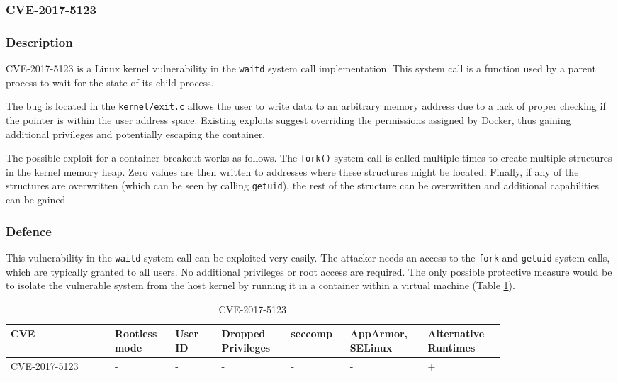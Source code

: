 \subsubsection{CVE-2017-5123}
\subsubsection*{Description}

CVE-2017-5123 is a Linux kernel vulnerability in the \texttt{waitd} system call implementation. This system call is a function used by a parent process to wait for the state of its child process.

The bug is located in the \texttt{kernel/exit.c} allows the user to write data to an arbitrary memory address due to a lack of proper checking if the pointer is within the user address space. Existing exploits suggest overriding the permissions assigned by Docker, thus gaining additional privileges and potentially escaping the container.

The possible exploit for a container breakout works as follows. The \texttt{fork()} system call is called multiple times to create multiple structures in the kernel memory heap. Zero values are then written to addresses where these structures might be located. Finally, if any of the structures are overwritten (which can be seen by calling \texttt{getuid}), the rest of the structure can be overwritten and additional capabilities can be gained.

\subsubsection*{Defence}

This vulnerability in the \texttt{waitd} system call can be exploited very easily. The attacker needs an access to the \texttt{fork} and \texttt{getuid} system calls, which are typically granted to all users. No additional privileges or root access are required. The only possible protective measure would be to isolate the vulnerable system from the host kernel by running it in a container within a virtual machine (Table \ref{tab:h:8}).

\begin{table}[H]
    \centering \small
    \begin{tabular}{| p{0.18\linewidth} | p{0.1\linewidth} | p{0.08\linewidth} | p{0.12\linewidth} | p{0.09\linewidth} | p{0.12\linewidth} | p{0.12\linewidth} |} \hline
    CVE & Rootless mode & User ID & Dropped Privileges & seccomp & AppArmor, SELinux & Alternative Runtimes \\ \hline
    CVE-2017-5123 & - & - & - & - & - & \cellcolor{green!25} + \\ \hline
    \end{tabular}
    \caption{CVE-2017-5123}
    \label{tab:h:8}
\end{table}


